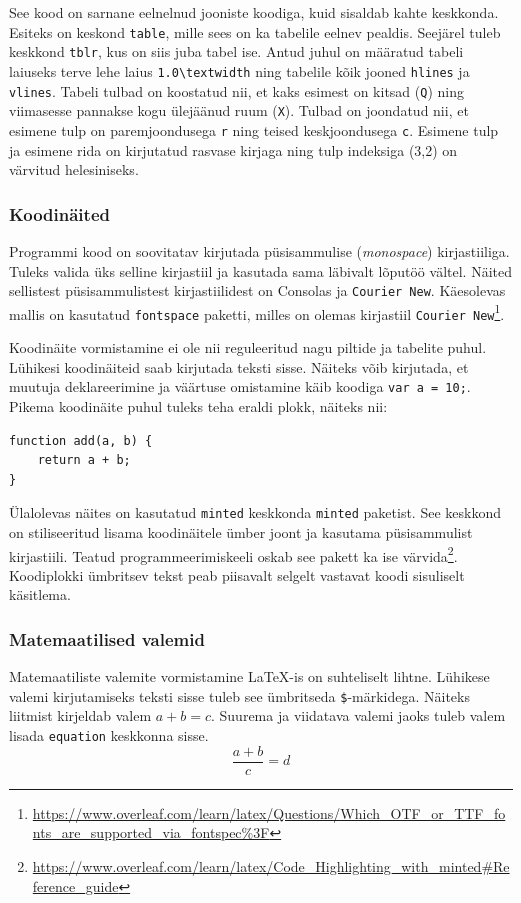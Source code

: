 See kood on sarnane eelnelnud jooniste koodiga, kuid sisaldab kahte keskkonda. Esiteks on keskond \verb|table|, mille sees on ka tabelile eelnev pealdis. Seejärel tuleb keskkond \verb|tblr|, kus on siis juba tabel ise. Antud juhul on määratud tabeli laiuseks terve lehe laius \verb|1.0\textwidth| ning tabelile kõik jooned \verb|hlines| ja \verb|vlines|. Tabeli tulbad on koostatud nii, et kaks esimest on kitsad (\verb|Q|) ning viimasesse pannakse kogu ülejäänud ruum (\verb|X|). Tulbad on joondatud nii, et esimene tulp on paremjoondusega \verb|r| ning teised keskjoondusega \verb|c|. Esimene tulp ja esimene rida on kirjutatud rasvase kirjaga ning tulp indeksiga (3,2) on värvitud helesiniseks.

\subsubsection{Koodinäited}
Programmi kood on soovitatav kirjutada püsisammulise (\emph{monospace}) kirjastiiliga. Tuleks valida üks selline kirjastiil ja kasutada sama läbivalt lõputöö vältel. Näited sellistest püsisammulistest kirjastiilidest on Consolas ja \texttt{Courier New}. Käesolevas mallis on kasutatud \verb|fontspace| paketti, milles on olemas kirjastiil \texttt{Courier New}\footnote{\url{https://www.overleaf.com/learn/latex/Questions/Which_OTF_or_TTF_fonts_are_supported_via_fontspec\%3F}}.

Koodinäite vormistamine ei ole nii reguleeritud nagu piltide ja tabelite puhul. Lühikesi koodinäiteid saab kirjutada teksti sisse. Näiteks võib kirjutada, et muutuja deklareerimine ja väärtuse omistamine käib koodiga \verb|var a = 10;|. Pikema koodinäite puhul tuleks teha eraldi plokk, näiteks nii:

\begin{verbatim}
function add(a, b) {
    return a + b;
}
\end{verbatim}

Ülalolevas näites on kasutatud \verb|minted| keskkonda \verb|minted| paketist. See keskkond on stiliseeritud lisama koodinäitele ümber joont ja kasutama püsisammulist kirjastiili. Teatud programmeerimiskeeli oskab see pakett ka ise värvida\footnote{\url{https://www.overleaf.com/learn/latex/Code_Highlighting_with_minted\#Reference_guide}}. Koodiplokki ümbritsev tekst peab piisavalt selgelt vastavat koodi sisuliselt käsitlema.

\subsubsection{Matemaatilised valemid}
Matemaatiliste valemite vormistamine LaTeX-is on suhteliselt lihtne. Lühikese valemi kirjutamiseks teksti sisse tuleb see ümbritseda \verb|$|-märkidega. Näiteks liitmist kirjeldab valem $a+b=c$. Suurema ja viidatava valemi jaoks tuleb valem lisada \verb|equation| keskkonna sisse.
\begin{equation}
    \frac{a + b}{c} = d
    \label{eq:abcdValem}
\end{equation}

